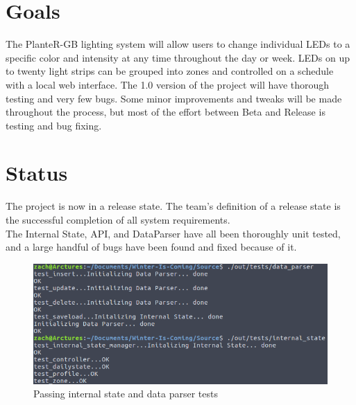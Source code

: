 \documentclass[onecolumn, draftclsnofoot,10pt, compsoc]{IEEEtran}
\begin{document}
	\section{Goals}
	The PlanteR-GB lighting system will allow users to change individual LEDs to a specific color and intensity at any time throughout the day or week.
	LEDs on up to twenty light strips can be grouped into zones and controlled on a schedule with a local web interface.
	The 1.0 version of the project will have thorough testing and very few bugs. Some minor improvements and tweaks will be made throughout the process,
	but most of the effort between Beta and Release is testing and bug fixing.

	\section{Status}
	The project is now in a release state. The team's definition of a release state is the successful completion of all system requirements.
	\\
	The Internal State, API, and DataParser have all been thoroughly unit tested, and a large handful of bugs have been found and fixed because of it.
	\begin{center}
		\begin{figure}[H]
			\includegraphics[width=\linewidth]{tests/internal_state_data_parser_tests.png}
			\caption{Passing internal state and data parser tests}
			\label{fig:isdpTests}
		\end{figure}
	\end{center}
\end{document}
